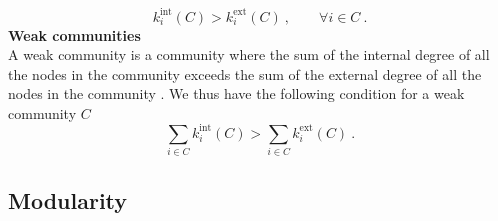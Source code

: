 \documentclass[11 pt , letterpaper , twoside , openright]{book}
\begin{document}
\begin{equation}
	k_i^{\textrm{int}}(C) > k_i^{\textrm{ext}}(C) \ , \qquad \forall i \in C \ .
\end{equation}
\newline
\textbf{Weak communities}\\
\newline
A weak community is a community where the sum of the internal degree of all the nodes in the community exceeds the sum of the external degree of all the nodes in the community \cite{Albert2016}\cite{F.Costa2007}. We thus have the following condition for a weak community $C$ \cite{Albert2016}
\begin{equation}
	\sum_{i \in C} k_i^{\textrm{int}}(C) > \sum_{i \in C}k_i^{\textrm{ext}}(C) \ .
\end{equation}

\subsection{Modularity}
\end{document}
